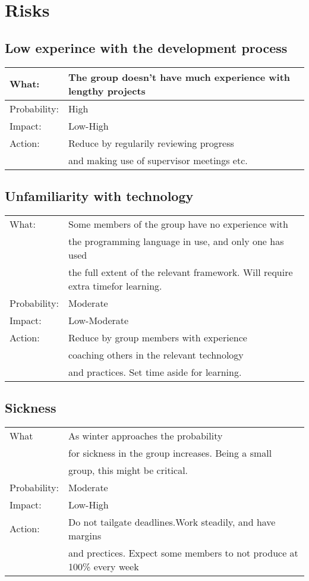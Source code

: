 \documentclass[12pt, a4paper]{article}
\begin{document}
\section{Risks}
\subsection{Low experince with the development process}
\begin{tabular}{| l | l |}
	\hline
	What: & The group doesn't have much experience with lengthy projects\\
	\hline
	Probability: & High \\
	\hline
	Impact: & Low-High \\
	\hline
	Action: & Reduce by regularily reviewing progress\\
	& and making use of supervisor meetings etc.\\
	\hline

\end{tabular}

\subsection{Unfamiliarity with technology}
\begin{tabular}{| l | l |}
	\hline
	What: & Some members of the group have no experience with\\
	& the programming language in use, and only one has used \\
	& the full extent of the relevant framework. Will require extra timefor learning.\\
	\hline
	Probability: & Moderate \\
	\hline
	Impact: & Low-Moderate \\
	\hline
	Action: & Reduce by group members with experience \\
	& coaching others in the relevant technology\\
	&and practices. Set time aside for learning.\\
	\hline

\end{tabular}

\subsection{Sickness}
\begin{tabular}{| l | l |}
	\hline
	What & As winter approaches the probability\\ 	&for sickness in the group increases. Being a small\\ 	&group, this might be critical.\\
	\hline
	Probability: & Moderate \\
	\hline
	Impact: & Low-High \\
	\hline
	Action: & Do not tailgate deadlines.Work steadily, and have margins\\
	&and prectices. Expect some members to not produce at 100\% every week\\
	\hline

\end{tabular}
\end{document}
